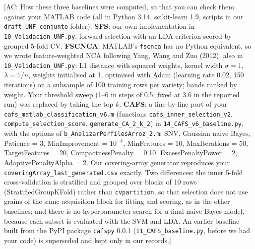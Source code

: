 \documentclass[final,5p,times,twocolumn]{elsarticle}
\newcommand{\acnote}[1]{{\color{red}\small\textsf{[AC: #1]}}}
\begin{document}
\acnote{How these three baselines were computed, so that you can check them against your MATLAB code (all in Python 3.14, scikit-learn 1.9, scripts in our \texttt{draft\_UNF\_conjunto} folder). \textbf{SFS}: our own implementation in \texttt{10\_Validacion\_UNF.py}, forward selection with an LDA criterion scored by grouped 5-fold CV. \textbf{FSCNCA}: MATLAB's \texttt{fscnca} has no Python equivalent, so we wrote feature-weighted NCA following Yang, Wang and Zuo (2012), also in \texttt{10\_Validacion\_UNF.py}: L1 distance with squared weights, kernel width $\sigma=1$, $\lambda=1/n$, weights initialised at 1, optimised with Adam (learning rate 0.02, 150 iterations) on a subsample of 100 training rows per variety; bands ranked by weight. Your threshold sweep (1--6 in steps of 0.5; fixed at 3.6 in the reported run) was replaced by taking the top $k$. \textbf{CAFS}: a line-by-line port of your \texttt{cafs\_matlab\_classification\_v6.m} (functions \texttt{cafs\_inner\_selection\_v2}, \texttt{compute\_selection\_score}, \texttt{generate\_CA\_2\_k\_2}) in \texttt{14\_CAFS\_v6\_baseline.py}, with the options of \texttt{b\_AnalizarPerfilesArroz\_2.m}: SNV, Gaussian naive Bayes, Patience = 3, MinImprovement = $10^{-4}$, MinFeatures = 10, MaxIterations = 50, TargetFeatures = 20, CompactnessPenalty = 0.10, ExcessPenaltyPower = 2, AdaptivePenaltyAlpha = 2. Our covering-array generator reproduces your \texttt{coveringArray\_last\_generated.csv} exactly. Two differences: the inner 5-fold cross-validation is stratified and grouped over blocks of 10 rows (StratifiedGroupKFold) rather than \texttt{cvpartition}, so that selection does not use grains of the same acquisition block for fitting and scoring, as in the other baselines; and there is no hyperparameter search for a final naive Bayes model, because each subset is evaluated with the SVM and LDA. An earlier baseline built from the PyPI package \texttt{cafspy} 0.0.1 (\texttt{11\_CAFS\_baseline.py}, before we had your code) is superseded and kept only in our records.}
\end{document}
